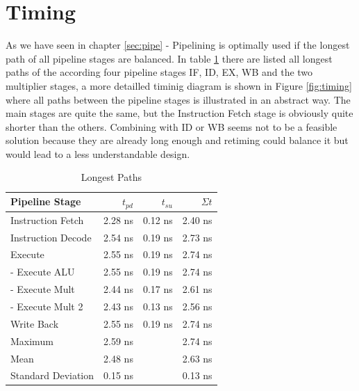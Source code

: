 \section{Timing}
As we have seen in chapter \ref{sec:pipe} - Pipelining is optimally used if the longest path of all pipeline stages are balanced. In table \ref{tab:longest_paths} there are listed all longest paths of the according four pipeline stages IF, ID, EX, WB and the two multiplier stages, a more detailled timinig diagram is shown in Figure \ref{fig:timing} where all paths between the pipeline stages is illustrated in an abstract way. The main stages are quite the same, but the Instruction Fetch stage is obviously quite shorter than the others. Combining with ID or WB seems not to be a feasible solution because they are already long enough and retiming could balance it but would lead to a less understandable design. 
\begin{table}[htbp]
 \caption{Longest Paths}
 \label{tab:longest_paths}
 \centering\begin{tabular}{|l|r|r|r|} \hline
\textbf{Pipeline Stage} & \textbf{$t_{pd}$} & \textbf{$t_{su}$} & \textbf{$\Sigma{t}$} \\ \hline
Instruction Fetch & 2.28 ns & 0.12 ns & 2.40 ns \\ \hline
Instruction Decode & 2.54 ns & 0.19 ns & 2.73 ns \\ \hline
Execute & 2.55 ns & 0.19 ns & 2.74 ns \\ \hline
- Execute ALU & 2.55 ns & 0.19 ns & 2.74 ns \\ \hline
- Execute Mult & 2.44 ns & 0.17 ns & 2.61 ns  \\ \hline
- Execute Mult 2 & 2.43 ns & 0.13 ns & 2.56 ns \\ \hline
Write Back & 2.55 ns & 0.19 ns & 2.74 ns \\ \hline \hline
Maximum & 2.59 ns & & 2.74 ns \\ \hline
Mean & 2.48 ns & & 2.63 ns\\ \hline
Standard Deviation & 0.15 ns & & 0.13 ns \\ \hline
 \end{tabular}
\end{table}

